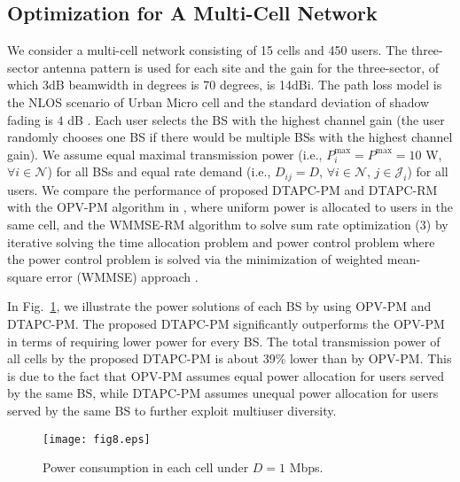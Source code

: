 \documentclass[journal]{IEEEtran}
\begin{document}
\subsection{Optimization for A Multi-Cell Network}
We consider a multi-cell network consisting of 15 cells and 450 users.
The three-sector antenna pattern is
used for each site
and the gain for the three-sector,
of which
3dB beamwidth in degrees
is 70 degrees, is 14dBi.
The path loss model is
the NLOS scenario of Urban Micro cell
and the standard deviation of shadow fading
is $4$ dB \cite{access2010further}.
Each user selects the BS with the highest channel gain (the user randomly chooses one BS if there would be multiple BSs with the highest channel gain).
We assume equal maximal transmission power (i.e., $P_i^{\max}=P^{\max}=10$ W, $\forall i \in \mathcal N$) for all BSs and equal rate demand (i.e., $D_{ij}=D$, $\forall i\in \mathcal N$, $j\in \mathcal J_i$) for all users.
We compare the performance of proposed DTAPC-PM and DTAPC-RM with the OPV-PM algorithm in \cite{Chin2015Power}, where uniform power is allocated to users in the same cell, and the WMMSE-RM algorithm to solve sum rate optimization (3) by iterative solving the time allocation problem and power control problem where the power control problem is solved via the minimization of weighted mean-square error (WMMSE) approach \cite{5756489}.


In Fig.~\ref{fig13}, we illustrate the power solutions of each BS by using OPV-PM and DTAPC-PM.
The proposed DTAPC-PM significantly outperforms the OPV-PM in terms of requiring lower power for every BS.
The total transmission power of all cells by the proposed DTAPC-PM is about 39\% lower than by OPV-PM.
This is due to the fact that OPV-PM assumes equal power allocation for users served by the same BS, while DTAPC-PM assumes unequal power allocation for users served by the same BS to further exploit multiuser diversity.

\begin{figure}
\centering
\texttt{[image: fig8.eps]}
\vspace{-1em}
\caption{Power consumption in each cell under $D=1$ Mbps. \label{fig13}}
\vspace{-1em}
\end{figure}
\end{document}
